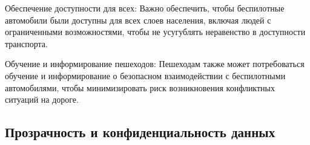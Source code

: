\documentclass{article}
\begin{document}
\begin{itemize}
\begin{itemize}
        Обеспечение доступности для всех: Важно обеспечить, чтобы беспилотные автомобили были доступны для всех слоев населения, включая людей с ограниченными возможностями, чтобы не усугублять неравенство в доступности транспорта.

        Обучение и информирование пешеходов: Пешеходам также может потребоваться обучение и информирование о безопасном взаимодействии с беспилотными автомобилями, чтобы минимизировать риск возникновения конфликтных ситуаций на дороге.
    \end{itemize}

\end{itemize}


\subsection{Прозрачность и конфиденциальность данных}
\end{document}

